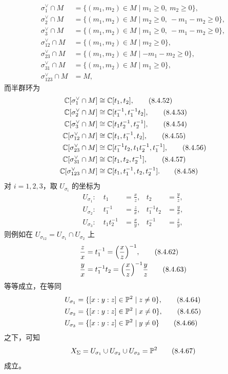 \begin{align}
  \sigma_1^\vee\cap M&=\{(m_1,m_2)\in M\mid m_1\ge 0,\ m_2\ge 0\}, \tag{8.4.45}\\
  \sigma_2^\vee\cap M&=\{(m_1,m_2)\in M\mid m_2\ge 0,\ -m_1-m_2\ge 0\}, \tag{8.4.46}\\
  \sigma_3^\vee\cap M&=\{(m_1,m_2)\in M\mid m_1\ge 0,\ -m_1-m_2\ge 0\}, \tag{8.4.47}\\
  \sigma_{12}^\vee\cap M&=\{(m_1,m_2)\in M\mid m_2\ge 0\}, \tag{8.4.48}\\
  \sigma_{23}^\vee\cap M&=\{(m_1,m_2)\in M\mid -m_1-m_2\ge 0\}, \tag{8.4.49}\\
  \sigma_{31}^\vee\cap M&=\{(m_1,m_2)\in M\mid m_1\ge 0\}, \tag{8.4.50}\\
  \sigma_{123}^\vee\cap M&=M, \tag{8.4.51}
\end{align}
而半群环为
\begin{align}
  \mathbb{C}[\sigma_1^\vee\cap M]&\cong\mathbb{C}[t_1,t_2], \tag{8.4.52}\\
  \mathbb{C}[\sigma_2^\vee\cap M]&\cong\mathbb{C}[t_1^{-1},t_1^{-1}t_2], \tag{8.4.53}\\
  \mathbb{C}[\sigma_3^\vee\cap M]&\cong\mathbb{C}[t_1t_2^{-1},t_2^{-1}], \tag{8.4.54}\\
  \mathbb{C}[\sigma_{12}^\vee\cap M]&\cong\mathbb{C}[t_1,t_1^{-1},t_2], \tag{8.4.55}\\
  \mathbb{C}[\sigma_{23}^\vee\cap M]&\cong\mathbb{C}[t_1^{-1}t_2,t_1t_2^{-1},t_1^{-1}], \tag{8.4.56}\\
  \mathbb{C}[\sigma_{31}^\vee\cap M]&\cong\mathbb{C}[t_1,t_2,t_2^{-1}], \tag{8.4.57}\\
  \mathbb{C}[\sigma_{123}^\vee\cap M]&\cong\mathbb{C}[t_1,t_1^{-1},t_2,t_2^{-1}]. \tag{8.4.58}
\end{align}
对 $i=1,2,3$，取 $U_{\sigma_i}$ 的坐标为
\begin{align}
  U_{\sigma_1}:\quad t_1&=\frac{x}{z}, & t_2&=\frac{y}{z}, \tag{8.4.59}\\
  U_{\sigma_2}:\quad t_1^{-1}&=\frac{z}{x}, & t_1^{-1}t_2&=\frac{y}{x}, \tag{8.4.60}\\
  U_{\sigma_3}:\quad t_1t_2^{-1}&=\frac{x}{y}, & t_2^{-1}&=\frac{z}{y}, \tag{8.4.61}
\end{align}
则例如在 $U_{\sigma_{12}}=U_{\sigma_1}\cap U_{\sigma_2}$ 上
\begin{align}
  \frac{z}{x}&=t_1^{-1}=\Bigl(\frac{x}{z}\Bigr)^{-1}, \tag{8.4.62}\\
  \frac{y}{x}&=t_1^{-1}t_2=\Bigl(\frac{x}{z}\Bigr)^{-1}\frac{y}{z} \tag{8.4.63}
\end{align}
等等成立，在等同
\begin{align}
  U_{\sigma_1}&=\{[x:y:z]\in\mathbb{P}^2\mid z\ne 0\}, \tag{8.4.64}\\
  U_{\sigma_2}&=\{[x:y:z]\in\mathbb{P}^2\mid x\ne 0\}, \tag{8.4.65}\\
  U_{\sigma_3}&=\{[x:y:z]\in\mathbb{P}^2\mid y\ne 0\} \tag{8.4.66}
\end{align}
之下，可知
\begin{equation}
  X_\Sigma=U_{\sigma_1}\cup U_{\sigma_2}\cup U_{\sigma_3}=\mathbb{P}^2 \tag{8.4.67}
\end{equation}
成立。

